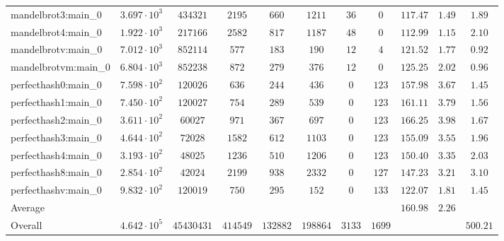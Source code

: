 \begin{tabular}{|l|c|c|c|c|c|c|c|c|c|c|}
mandelbrot3:main\_0            & $ 3.697 \cdot 10^{3} $ & $ 434321   $ & $ 2195   $ & $ 660    $ & $ 1211   $ & $ 36   $ & $ 0    $ & $ 117.47      $ & $ 1.49    $ & $ 1.89    $ \\
mandelbrot4:main\_0            & $ 1.922 \cdot 10^{3} $ & $ 217166   $ & $ 2582   $ & $ 817    $ & $ 1187   $ & $ 48   $ & $ 0    $ & $ 112.99      $ & $ 1.15    $ & $ 2.10    $ \\
mandelbrotv:main\_0            & $ 7.012 \cdot 10^{3} $ & $ 852114   $ & $ 577    $ & $ 183    $ & $ 190    $ & $ 12   $ & $ 4    $ & $ 121.52      $ & $ 1.77    $ & $ 0.92    $ \\
mandelbrotvm:main\_0           & $ 6.804 \cdot 10^{3} $ & $ 852238   $ & $ 872    $ & $ 279    $ & $ 376    $ & $ 12   $ & $ 0    $ & $ 125.25      $ & $ 2.02    $ & $ 0.96    $ \\
perfecthash0:main\_0           & $ 7.598 \cdot 10^{2} $ & $ 120026   $ & $ 636    $ & $ 244    $ & $ 436    $ & $ 0    $ & $ 123  $ & $ 157.98      $ & $ 3.67    $ & $ 1.45    $ \\
perfecthash1:main\_0           & $ 7.450 \cdot 10^{2} $ & $ 120027   $ & $ 754    $ & $ 289    $ & $ 539    $ & $ 0    $ & $ 123  $ & $ 161.11      $ & $ 3.79    $ & $ 1.56    $ \\
perfecthash2:main\_0           & $ 3.611 \cdot 10^{2} $ & $ 60027    $ & $ 971    $ & $ 367    $ & $ 697    $ & $ 0    $ & $ 123  $ & $ 166.25      $ & $ 3.98    $ & $ 1.67    $ \\
perfecthash3:main\_0           & $ 4.644 \cdot 10^{2} $ & $ 72028    $ & $ 1582   $ & $ 612    $ & $ 1103   $ & $ 0    $ & $ 123  $ & $ 155.09      $ & $ 3.55    $ & $ 1.96    $ \\
perfecthash4:main\_0           & $ 3.193 \cdot 10^{2} $ & $ 48025    $ & $ 1236   $ & $ 510    $ & $ 1206   $ & $ 0    $ & $ 123  $ & $ 150.40      $ & $ 3.35    $ & $ 2.03    $ \\
perfecthash8:main\_0           & $ 2.854 \cdot 10^{2} $ & $ 42024    $ & $ 2199   $ & $ 938    $ & $ 2332   $ & $ 0    $ & $ 127  $ & $ 147.23      $ & $ 3.21    $ & $ 3.10    $ \\
perfecthashv:main\_0           & $ 9.832 \cdot 10^{2} $ & $ 120019   $ & $ 750    $ & $ 295    $ & $ 152    $ & $ 0    $ & $ 133  $ & $ 122.07      $ & $ 1.81    $ & $ 1.45    $ \\
\hline
Average                        & $                    $ & $          $ & $        $ & $        $ & $        $ & $      $ & $      $ & $ 160.98      $ & $ 2.26    $ & $         $ \\
\hline
Overall                        & $ 4.642 \cdot 10^{5} $ & $ 45430431 $ & $ 414549 $ & $ 132882 $ & $ 198864 $ & $ 3133 $ & $ 1699 $ & $             $ & $         $ & $ 500.21  $ \\
\hline
\end{tabular}
